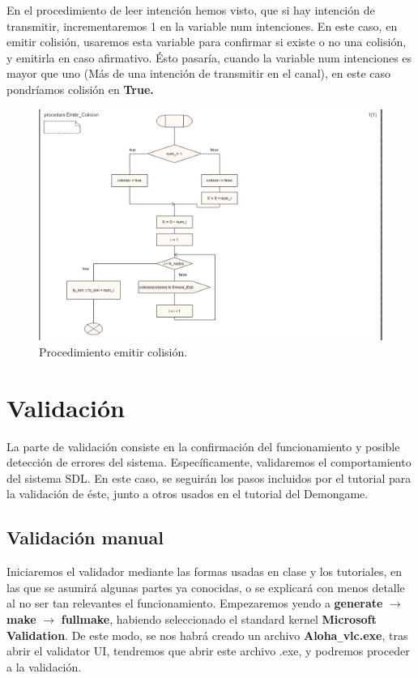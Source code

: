 \documentclass{article}
\begin{document}
En el procedimiento de leer intención hemos visto, que si hay intención de transmitir, incrementaremos 1 en la variable num intenciones. En este caso, en emitir colisión, usaremos esta variable para confirmar si existe o no una colisión, y emitirla en caso afirmativo. Ésto pasaría, cuando la variable num intenciones es mayor que uno (Más de una intención de transmitir en el canal), en este caso pondríamos colisión en \textbf{True.}

\quad

\begin{figure}[h]
    \centering
    \includegraphics[width=0.8\linewidth]{src/proc emitir col.png}
    \caption{\label{fig:emitircol} Procedimiento emitir colisión.}
\end{figure}
\newpage

\section{Validación}

La parte de validación consiste en la confirmación del funcionamiento y posible detección de errores del sistema. Específicamente, validaremos el comportamiento del sistema SDL. En este caso, se seguirán los pasos incluidos por el tutorial para la validación de éste, junto a otros usados en el tutorial del Demongame.

\quad

\subsection{Validación manual}

Iniciaremos el validador mediante las formas usadas en clase y los tutoriales, en las que se asumirá algunas partes ya conocidas, o se explicará con menos detalle al no ser tan relevantes el funcionamiento. Empezaremos yendo a \textbf{generate} $\rightarrow$ \textbf{make} $\rightarrow$ \textbf{fullmake}, habiendo seleccionado el standard kernel \textbf{Microsoft Validation}. De este modo, se nos habrá creado un archivo \textbf{Aloha}\verb|_|\textbf{vlc.exe}, tras abrir el validator UI, tendremos que abrir este archivo .exe, y podremos proceder a la validación.
\end{document}
